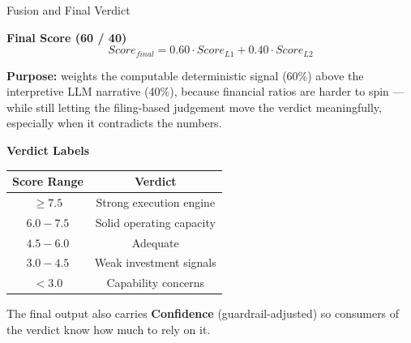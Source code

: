 \documentclass[aspectratio=169]{beamer}
\begin{document}
\begin{frame}{Fusion and Final Verdict}

\textbf{Final Score (60 / 40)}
\[
Score_{final} = 0.60 \cdot Score_{L1} + 0.40 \cdot Score_{L2}
\]

\textbf{Purpose:} weights the computable deterministic signal (60\%) above the
interpretive LLM narrative (40\%), because financial ratios are harder to spin
--- while still letting the filing-based judgement move the verdict meaningfully,
especially when it contradicts the numbers.

\vspace{0.4cm}
\textbf{Verdict Labels}
\begin{center}
\begin{tabular}{cc}
\toprule
\textbf{Score Range} & \textbf{Verdict} \\
\midrule
$\geq 7.5$ & Strong execution engine \\
$6.0 - 7.5$ & Solid operating capacity \\
$4.5 - 6.0$ & Adequate \\
$3.0 - 4.5$ & Weak investment signals \\
$< 3.0$ & Capability concerns \\
\bottomrule
\end{tabular}
\end{center}

\vspace{0.3cm}
The final output also carries \textbf{Confidence} (guardrail-adjusted) so
consumers of the verdict know how much to rely on it.

\end{frame}
\end{document}
